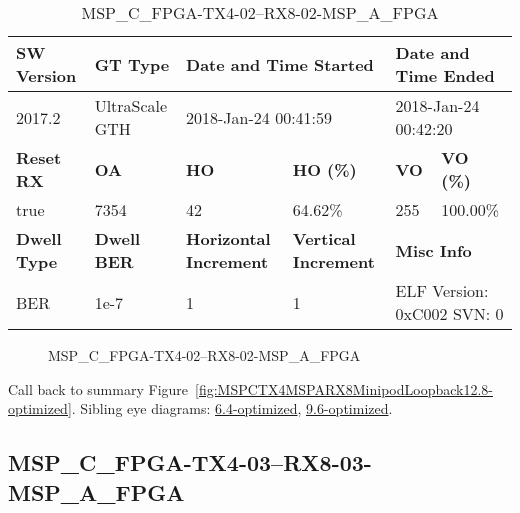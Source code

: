 \begin{table}[h]
\centering
\caption{MSP\_C\_FPGA-TX4-02--RX8-02-MSP\_A\_FPGA}
\label{tab:MSPCFPGATX402RX802MSPAFPGA12.8-optimized}
\begin{tabular}{@{}|l|l|l|l|l|l|@{}}
\toprule
\textbf{SW Version}                & \textbf{GT Type}   & \multicolumn{2}{l|}{\textbf{Date and Time Started}}            & \multicolumn{2}{l|}{\textbf{Date and Time Ended}}        \\ \midrule
2017.2                       & UltraScale GTH          & \multicolumn{2}{l|}{2018-Jan-24 00:41:59}                   & \multicolumn{2}{l|}{2018-Jan-24 00:42:20}               \\ \midrule
\textbf{Reset RX}                  & \textbf{OA} & \textbf{HO}   & \textbf{HO (\%)} & \textbf{VO} & \textbf{VO (\%)} \\ \midrule
true & 7354        & 42          & 64.62\%        & 255        & 100.00\%       \\ \midrule
\textbf{Dwell Type}                & \textbf{Dwell BER} & \textbf{Horizontal Increment} & \textbf{Vertical Increment}    & \multicolumn{2}{l|}{\textbf{Misc Info}}                  \\ \midrule
BER                            & 1e-7        & 1        & 1           & \multicolumn{2}{l|}{ELF Version: 0xC002 SVN: 0}                         \\ \bottomrule
\end{tabular}
\end{table}

\begin{figure}[h]
\caption{MSP\_C\_FPGA-TX4-02--RX8-02-MSP\_A\_FPGA} \label{fig:MSPCFPGATX402RX802MSPAFPGA12.8-optimized}
\end{figure}

Call back to summary Figure~\ref{fig:MSPCTX4MSPARX8MinipodLoopback12.8-optimized}.
Sibling eye diagrams: \hyperref[sec:MSPCFPGATX402RX802MSPAFPGA6.4-optimized]{6.4-optimized}, \hyperref[sec:MSPCFPGATX402RX802MSPAFPGA9.6-optimized]{9.6-optimized}.

\clearpage
\newpage


\subsection{MSP\_C\_FPGA-TX4-03--RX8-03-MSP\_A\_FPGA}\label{sec:MSPCFPGATX403RX803MSPAFPGA12.8-optimized}

